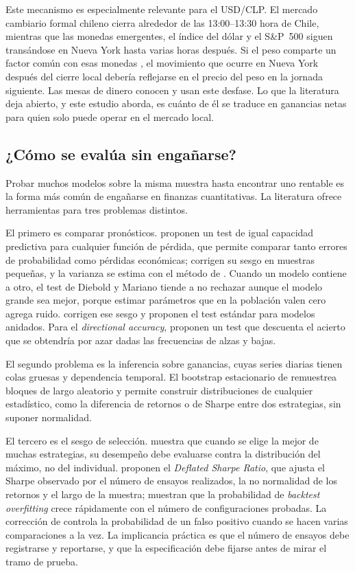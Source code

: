 \documentclass[11pt,a4paper]{article}
\begin{document}
Este mecanismo es especialmente relevante para el USD/CLP. El mercado cambiario formal chileno cierra alrededor de las 13:00--13:30 hora de Chile, mientras que las monedas emergentes, el índice del dólar y el S\&P~500 siguen transándose en Nueva York hasta varias horas después. Si el peso comparte un factor común con esas monedas \citep{lustig2011}, el movimiento que ocurre en Nueva York después del cierre local debería reflejarse en el precio del peso en la jornada siguiente. Las mesas de dinero conocen y usan este desfase. Lo que la literatura deja abierto, y este estudio aborda, es cuánto de él se traduce en ganancias netas para quien solo puede operar en el mercado local.

\subsection{¿Cómo se evalúa sin engañarse?}

Probar muchos modelos sobre la misma muestra hasta encontrar uno rentable es la forma más común de engañarse en finanzas cuantitativas. La literatura ofrece herramientas para tres problemas distintos.

El primero es comparar pronósticos. \citet{diebold1995} proponen un test de igual capacidad predictiva para cualquier función de pérdida, que permite comparar tanto errores de probabilidad como pérdidas económicas; \citet{harvey1997} corrigen su sesgo en muestras pequeñas, y la varianza se estima con el método de \citet{newey1987}. Cuando un modelo contiene a otro, el test de Diebold y Mariano tiende a no rechazar aunque el modelo grande sea mejor, porque estimar parámetros que en la población valen cero agrega ruido. \citet{clark2007} corrigen ese sesgo y proponen el test estándar para modelos anidados. Para el \emph{directional accuracy}, \citet{pesaran1992} proponen un test que descuenta el acierto que se obtendría por azar dadas las frecuencias de alzas y bajas.

El segundo problema es la inferencia sobre ganancias, cuyas series diarias tienen colas gruesas y dependencia temporal. El bootstrap estacionario de \citet{politis1994} remuestrea bloques de largo aleatorio y permite construir distribuciones de cualquier estadístico, como la diferencia de retornos o de Sharpe entre dos estrategias, sin suponer normalidad.

El tercero es el sesgo de selección. \citet{white2000} muestra que cuando se elige la mejor de muchas estrategias, su desempeño debe evaluarse contra la distribución del máximo, no del individual. \citet{bailey2014} proponen el \emph{Deflated Sharpe Ratio}, que ajusta el Sharpe observado por el número de ensayos realizados, la no normalidad de los retornos y el largo de la muestra; \citet{bailey2017} muestran que la probabilidad de \emph{backtest overfitting} crece rápidamente con el número de configuraciones probadas. La corrección de \citet{holm1979} controla la probabilidad de un falso positivo cuando se hacen varias comparaciones a la vez. La implicancia práctica es que el número de ensayos debe registrarse y reportarse, y que la especificación debe fijarse antes de mirar el tramo de prueba.
\end{document}
